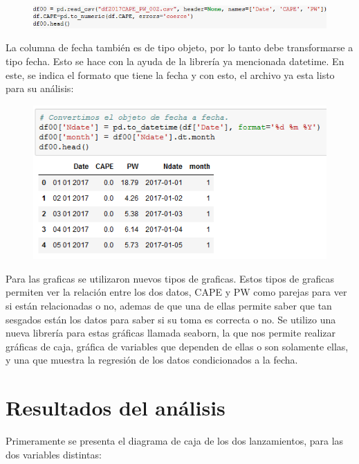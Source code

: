 \documentclass[12pt]{article}
\begin{document}
\begin{figure}[h!]
    \centering
\includegraphics[width=6in]{Ana1.png}
\end{figure}

La columna de fecha también es de tipo objeto, por lo tanto debe transformarse a tipo fecha. Esto se hace con la ayuda de la librería ya mencionada datetime. En este, se indica el formato que tiene la fecha y con esto, el archivo ya esta listo para su análisis: 

\begin{figure}[h!]
    \centering
\includegraphics[width=6in]{Ana2.png}
\end{figure}

Para las graficas se utilizaron nuevos tipos de graficas. Estos tipos de graficas permiten ver la relación entre los dos datos, CAPE y PW como parejas para ver si están relacionadas o no, ademas de que una de ellas permite saber que tan sesgados están los datos para saber si su toma es correcta o no. Se utilizo una nueva librería para estas gráficas llamada seaborn, la que nos permite realizar gráficas de caja, gráfica de variables que dependen de ellas o son solamente ellas, y una que muestra la regresión de los datos condicionados a la fecha.

\section{Resultados del análisis}
Primeramente se presenta el diagrama de caja de los dos lanzamientos, para las dos variables distintas:
\end{document}
